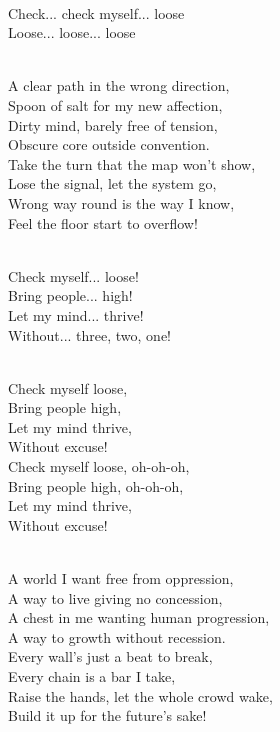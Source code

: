 \begin{lyrics}
\\
Check... check myself... loose\\
Loose... loose... loose

\\
A clear path in the wrong direction,\\
Spoon of salt for my new affection,\\
Dirty mind, barely free of tension,\\
Obscure core outside convention.\\
Take the turn that the map won't show,\\
Lose the signal, let the system go,\\
Wrong way round is the way I know,\\
Feel the floor start to overflow!

\\
Check myself... loose!\\
Bring people... high!\\
Let my mind... thrive!\\
Without... three, two, one!

\\
Check myself loose,\\
Bring people high,\\
Let my mind thrive,\\
Without excuse!\\
Check myself loose, oh-oh-oh,\\
Bring people high, oh-oh-oh,\\
Let my mind thrive,\\
Without excuse!

\\
A world I want free from oppression,\\
A way to live giving no concession,\\
A chest in me wanting human progression,\\
A way to growth without recession.\\
Every wall's just a beat to break,\\
Every chain is a bar I take,\\
Raise the hands, let the whole crowd wake,\\
Build it up for the future's sake!


\end{lyrics}
